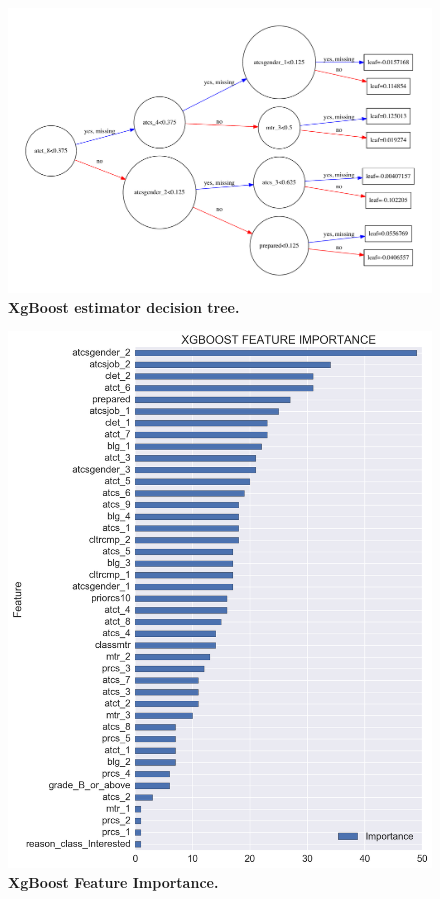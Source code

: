 \begin{figure}[!hbtp]
\centering
    \includegraphics[width=1.25\textwidth]{figures/X_graph}
    \caption{\textbf{XgBoost estimator decision tree. }\textit{}}\label{plot_tree}
\end{figure}

\begin{figure}[!hbtp]
\centering
    \includegraphics[width=1\textwidth]{figures/featureImportance}
    \caption{\textbf{XgBoost Feature Importance. }\textit{}}\label{importance}
\end{figure}

